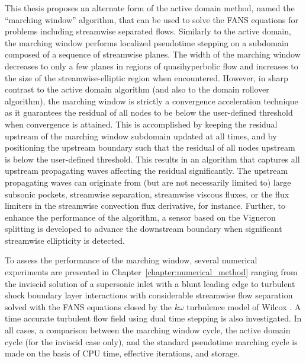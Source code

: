 This thesis proposes an alternate form of the active domain method,
named the ``marching window'' algorithm, that can be used to solve the FANS
equations for problems including streamwise separated flows. Similarly to the
active domain, the marching window
performs localized pseudotime stepping on a subdomain
composed of a sequence of streamwise planes. The width of the marching window
decreases to only a few planes in regions of quasihyperbolic flow
and increases to the size of the streamwise-elliptic region when encountered.
However, in sharp contrast to the active domain algorithm (and also to the domain
rollover algorithm), the marching window is
strictly a convergence acceleration technique as it guarantees the residual of
all nodes to be below the user-defined threshold when convergence is attained.
This is accomplished by keeping the residual upstream of the marching
window subdomain updated at all times, and by positioning the upstream boundary
such that the residual of all nodes upstream is below the user-defined threshold.
This results in an algorithm that captures all upstream
propagating waves affecting the residual significantly. The upstream
propagating waves can originate from (but are not necessarily limited to) large subsonic
pockets, streamwise separation, streamwise viscous fluxes, or the flux limiters in
the streamwise convection flux derivative, for instance. Further,
to enhance the performance of the algorithm,
a sensor based on the Vigneron splitting \cite{aiaaconf:1978:vigneron}
is developed to advance the downstream boundary
when significant streamwise ellipticity is detected.


To assess the performance of the marching window, several numerical experiments are
presented in Chapter~\ref{chapter:numerical_method}
ranging from the inviscid solution
of a supersonic inlet with a blunt leading edge to turbulent shock boundary layer interactions
with considerable streamwise flow separation solved with the FANS
equations closed by the $k\omega$ turbulence
model of Wilcox \cite{aiaa:1988:wilcox}. A time accurate turbulent flow field using
dual time stepping is also investigated. In all cases, a comparison between the
marching window cycle, the active domain cycle (for the inviscid case only),
and the standard pseudotime marching cycle
is made on the basis of CPU time, effective iterations, and storage.


